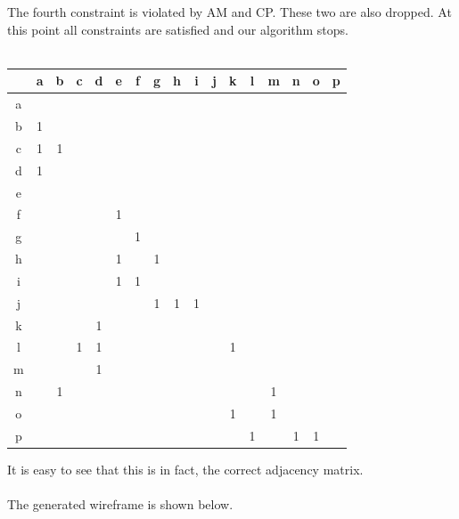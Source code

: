 \documentclass[
11pt, %
english, %
singlespacing, %
headsepline, %
]{MastersDoctoralThesis} %
\begin{document}
The fourth constraint is violated by AM and CP. These two are also dropped. At this point all constraints are satisfied and our algorithm stops.\\ \\
\begin{center}
\begin{tabular}[width = \textwidth]{ |c|c|c|c|c|c|c|c|c|c|c|c|c|c|c|c|c| } 
\hline
  & a & b & c & d & e & f & g & h & i & j & k & l & m & n & o & p \\ \hline \hline
a &   &   &   &   &   &   &   &   &   &   &   &   &   &   &   &   \\ \hline
b & 1 &   &   &   &   &   &   &   &   &   &   &   &   &   &   &   \\ \hline
c & 1 & 1 &   &   &   &   &   &   &   &   &   &   &   &   &   &   \\ \hline
d & 1 &   &   &   &   &   &   &   &   &   &   &   &   &   &   &   \\ \hline
e &   &   &   &   &   &   &   &   &   &   &   &   &   &   &   &   \\ \hline
f &   &   &   &   & 1 &   &   &   &   &   &   &   &   &   &   &   \\ \hline
g &   &   &   &   &   & 1 &   &   &   &   &   &   &   &   &   &   \\ \hline
h &   &   &   &   & 1 &   & 1 &   &   &   &   &   &   &   &   &   \\ \hline 
i &   &   &   &   & 1 & 1 &   &   &   &   &   &   &   &   &   &   \\ \hline
j &   &   &   &   &   &   & 1 & 1 & 1 &   &   &   &   &   &   &   \\ \hline
k &   &   &   & 1 &   &   &   &   &   &   &   &   &   &   &   &   \\ \hline
l &   &   & 1 & 1 &   &   &   &   &   &   & 1 &   &   &   &   &   \\ \hline
m &   &   &   & 1 &   &   &   &   &   &   &   &   &   &   &   &   \\ \hline
n &   & 1 &   &   &   &   &   &   &   &   &   &   & 1 &   &   &   \\ \hline
o &   &   &   &   &   &   &   &   &   &   & 1 &   & 1 &   &   &   \\ \hline
p &   &   &   &   &   &   &   &   &   &   &   & 1 &   & 1 & 1 &   \\ \hline
\hline
\end{tabular}
\end{center}
It is easy to see that this is in fact, the correct adjacency matrix.\\ \\ The generated wireframe is shown below. 
\end{document}
